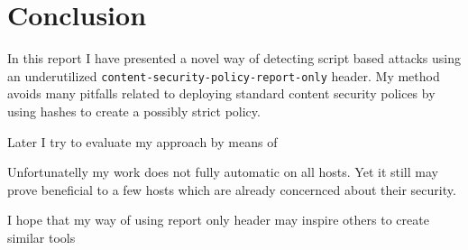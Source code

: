 \chapter{Conclusion}

In this report I have presented a novel way of detecting script based attacks using an underutilized \texttt{content-security-policy-report-only} header.
My method avoids many pitfalls related to deploying standard content security polices by using hashes to create a possibly strict policy.

Later I try to evaluate my approach by means of 

Unfortunatelly my work does not fully automatic on all hosts.
Yet it still may prove beneficial to a few hosts which are already concernced about their security.

I hope that my way of using report only header may inspire others to create similar tools
